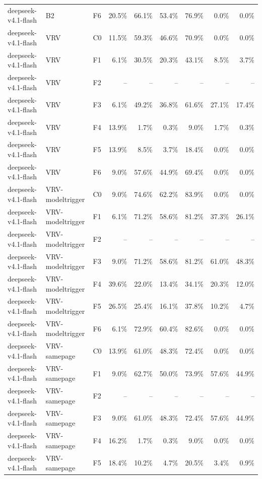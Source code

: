 \begin{tabular}{lllrrrrrr}
deepseek-v4.1-flash & B2 & F6 & 20.5\% & 66.1\% & 53.4\% & 76.9\% & 0.0\% & 0.0\% \\
deepseek-v4.1-flash & VRV & C0 & 11.5\% & 59.3\% & 46.6\% & 70.9\% & 0.0\% & 0.0\% \\
deepseek-v4.1-flash & VRV & F1 & 6.1\% & 30.5\% & 20.3\% & 43.1\% & 8.5\% & 3.7\% \\
deepseek-v4.1-flash & VRV & F2 & -- & -- & -- & -- & -- & -- \\
deepseek-v4.1-flash & VRV & F3 & 6.1\% & 49.2\% & 36.8\% & 61.6\% & 27.1\% & 17.4\% \\
deepseek-v4.1-flash & VRV & F4 & 13.9\% & 1.7\% & 0.3\% & 9.0\% & 1.7\% & 0.3\% \\
deepseek-v4.1-flash & VRV & F5 & 13.9\% & 8.5\% & 3.7\% & 18.4\% & 0.0\% & 0.0\% \\
deepseek-v4.1-flash & VRV & F6 & 9.0\% & 57.6\% & 44.9\% & 69.4\% & 0.0\% & 0.0\% \\
deepseek-v4.1-flash & VRV-modeltrigger & C0 & 9.0\% & 74.6\% & 62.2\% & 83.9\% & 0.0\% & 0.0\% \\
deepseek-v4.1-flash & VRV-modeltrigger & F1 & 6.1\% & 71.2\% & 58.6\% & 81.2\% & 37.3\% & 26.1\% \\
deepseek-v4.1-flash & VRV-modeltrigger & F2 & -- & -- & -- & -- & -- & -- \\
deepseek-v4.1-flash & VRV-modeltrigger & F3 & 9.0\% & 71.2\% & 58.6\% & 81.2\% & 61.0\% & 48.3\% \\
deepseek-v4.1-flash & VRV-modeltrigger & F4 & 39.6\% & 22.0\% & 13.4\% & 34.1\% & 20.3\% & 12.0\% \\
deepseek-v4.1-flash & VRV-modeltrigger & F5 & 26.5\% & 25.4\% & 16.1\% & 37.8\% & 10.2\% & 4.7\% \\
deepseek-v4.1-flash & VRV-modeltrigger & F6 & 6.1\% & 72.9\% & 60.4\% & 82.6\% & 0.0\% & 0.0\% \\
deepseek-v4.1-flash & VRV-samepage & C0 & 13.9\% & 61.0\% & 48.3\% & 72.4\% & 0.0\% & 0.0\% \\
deepseek-v4.1-flash & VRV-samepage & F1 & 9.0\% & 62.7\% & 50.0\% & 73.9\% & 57.6\% & 44.9\% \\
deepseek-v4.1-flash & VRV-samepage & F2 & -- & -- & -- & -- & -- & -- \\
deepseek-v4.1-flash & VRV-samepage & F3 & 9.0\% & 61.0\% & 48.3\% & 72.4\% & 57.6\% & 44.9\% \\
deepseek-v4.1-flash & VRV-samepage & F4 & 16.2\% & 1.7\% & 0.3\% & 9.0\% & 0.0\% & 0.0\% \\
deepseek-v4.1-flash & VRV-samepage & F5 & 18.4\% & 10.2\% & 4.7\% & 20.5\% & 3.4\% & 0.9\% \\

\end{tabular}
